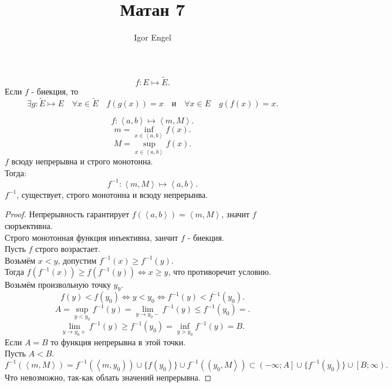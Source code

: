\documentclass[11pt, oneside]{article}   	%
\title{Матан 7}
\author{Igor Engel}
\date{}
\begin{document}
\maketitle
\section{}
    
\begin{definition}
    \[ f: E \mapsto \tilde{E} .\]
    Если $f$ - биекция, то
    \[ \exists{g: \tilde{E} \mapsto E}\quad \forall{x\in \tilde{E}}\quad f(g(x)) = x\quad \text{и}\quad \forall{x\in E}\quad g(f(x)) = x   .\] 
\end{definition}
\begin{theorem}
    \[ f: \left<a, b\right> \mapsto \left<m, M\right> .\]
    \[ m =\inf_{x\in \left<a, b\right>} f(x) .\]
    \[ M = \sup_{x\in \left<a, b\right>} f(x) .\]
    $f$ всюду непрерывна и строго монотонна.\\
    Тогда:
    \[ f^{-1}: \left<m, M\right> \mapsto \left<a, b\right> .\]
    $f^{-1}$, существует, строго монотонна и всюду непрерынва.
    \begin{proof}
        Непрерывность гарантирует $f(\left<a,b\right>) = \left<m, M\right>$, значит $f$ сюръективна.\\
        Строго монотонная функция инъективна, занчит $f$ - биекция.\\
        Пусть $f$ строго возрастает.\\
        Возьмём $x<y$, допустим $f^{-1}(x) \ge f^{-1}(y)$.\\
        Тогда $f(f^{-1}(x)) \ge f(f^{-1}(y)) \iff x \ge y$, что противоречит условию.\\
        Возьмём произвольную точку $y_9$.\\
        \[ f(y) < f(y_0) \iff y < y_0 \iff f^{-1}(y) < f^{-1}(y_0).\]
        \[ A = \sup\limits_{y<y_0} f^{-1}(y) = \lim\limits_{y \to y_0-} f^{-1}(y) \le f^{-1}(y_0) =  .\]
        \[ \lim\limits_{y \to y_0+} f^{-1}(y) \ge f^{-1}(y_0) = \inf\limits_{y>y_0} f^{-1}(y) = B.\]
        Если $A=B$ то функция непрерывна в этой точки.\\
        Пусть $A<B$.\\
        \[ f^{-1}\left( \left<m, M\right> \right) = f^{-1}\left( \left<m, y_0\right) \right) \cup \{f(y_0)\} \cup f^{-1}\left( \left(y_0, M\right> \right) \subset \left(-\infty; A\right] \cup \{f^{-1}(y_0)\} \cup \left[B; \infty\right)    .\]
        Что невозможно, так-как облать значений непрерывна.
    \end{proof}
\end{theorem}
\end{document}
